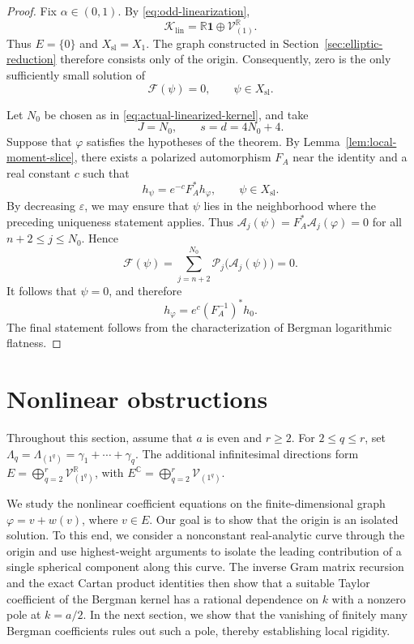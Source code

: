 \documentclass[11pt,reqno]{amsart}
\theoremstyle{corollary}
\theoremstyle{conjecture}
\theoremstyle{assumption}
\theoremstyle{proposition}
\theoremstyle{remark}
\numberwithin{equation}{section}
\begin{document}
\begin{proof}
Fix $\alpha\in(0,1)$. By \eqref{eq:odd-linearization},
\[
\mathcal K_{\operatorname{lin}}=\mathbb R\mathbf1\oplus\mathcal V_{(1)}^{\mathbb R}.
\]
Thus $E=\{0\}$ and $X_{\mathrm{sl}}=X_1$. The graph constructed in Section~\ref{sec:elliptic-reduction} therefore consists only of the origin. Consequently, zero is the only sufficiently small solution of
\[
\mathcal F(\psi)=0,\qquad \psi\in X_{\mathrm{sl}}.
\]

Let $N_0$ be chosen as in \eqref{eq:actual-linearized-kernel}, and take
\[
J=N_0,\qquad s=d=4N_0+4.
\]
Suppose that $\varphi$ satisfies the hypotheses of the theorem. By Lemma~\ref{lem:local-moment-slice}, there exists a polarized automorphism $F_A$ near the identity and a real constant $c$ such that
\[
h_\psi=e^{-c}F_A^*h_\varphi,\qquad \psi\in X_{\mathrm{sl}}.
\]
By decreasing $\varepsilon$, we may ensure that $\psi$ lies in the neighborhood where the preceding uniqueness statement applies. Thus $\mathcal A_j(\psi)=F_A^*\mathcal A_j(\varphi)=0$ for all $n+2\leq j\leq N_0$.
Hence
\[
\mathcal F(\psi)=\sum_{j=n+2}^{N_0}\mathcal P_j\bigl(\mathcal A_j(\psi)\bigr)=0.
\]
It follows that $\psi=0$, and therefore
\[
h_\varphi=e^c(F_A^{-1})^*h_0.
\]
The final statement follows from the characterization of Bergman logarithmic flatness.
\end{proof}



\section{Nonlinear obstructions}
\label{sec:nonlinear-obstructions}

Throughout this section, assume that $a$ is even and $r\geq 2$. For $2\leq q\leq r$, set $\Lambda_q=\Lambda_{(1^q)}=\gamma_1+\cdots+\gamma_q$. The additional infinitesimal directions form $E=\bigoplus_{q=2}^r\mathcal V_{(1^q)}^{\mathbb R}$, with $E^{\mathbb C}=\bigoplus_{q=2}^r\mathcal V_{(1^q)}$.

We study the nonlinear coefficient equations on the finite-dimensional graph $\varphi=v+w(v)$, where $v\in E$. Our goal is to show that the origin is an isolated solution. To this end, we consider a nonconstant real-analytic curve through the origin and use highest-weight arguments to isolate the leading contribution of a single spherical component along this curve. The inverse Gram matrix recursion and the exact Cartan product identities then show that a suitable Taylor coefficient of the Bergman kernel has a rational dependence on $k$ with a nonzero pole at $k=a/2$. In the next section, we show that the vanishing of finitely many Bergman coefficients rules out such a pole, thereby establishing local rigidity.
\end{document}
